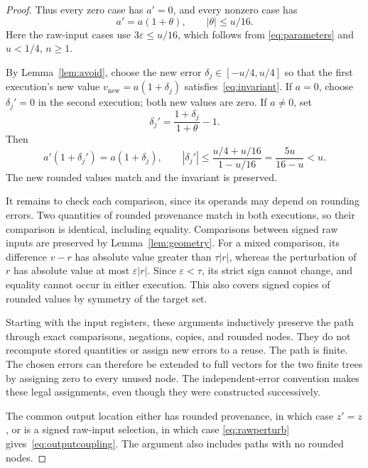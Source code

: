 \documentclass[11pt,a4paper]{article}
\numberwithin{equation}{section}
\theoremstyle{definition}
\theoremstyle{remark}
\newcommand{\abs}[1]{\left|#1\right|}
\begin{document}
\begin{proof}
Thus every zero case has $a'=0$, and every nonzero case has
\begin{equation}\label{eq:centerchange}
 a'=a(1+\theta),\qquad\abs\theta\le u/16.
\end{equation}
Here the raw-input cases use $3\varepsilon\le u/16$, which follows from
\eqref{eq:parameters} and $u<1/4$, $n\ge1$.

By Lemma~\ref{lem:avoid}, choose the new error $\delta_j\in[-u/4,u/4]$
so that the first execution's new value
$v_{\mathrm{new}}=a(1+\delta_j)$ satisfies~\eqref{eq:invariant}.
If $a=0$, choose $\delta_j'=0$ in the second execution; both new values
are zero.  If $a\ne0$, set
\begin{equation}\label{eq:matcherror}
 \delta_j'=\frac{1+\delta_j}{1+\theta}-1.
\end{equation}
Then
\[
 a'(1+\delta_j')=a(1+\delta_j),
 \qquad
 \abs{\delta_j'}
 \le\frac{u/4+u/16}{1-u/16}
 =\frac{5u}{16-u}<u.
\]
The new rounded values match and the invariant is preserved.

It remains to check each comparison, since its operands may depend on
rounding errors.  Two quantities of rounded provenance match in both
executions, so their comparison is identical, including equality.
Comparisons between signed raw inputs are preserved by
Lemma~\ref{lem:geometry}.  For a mixed comparison, its difference $v-r$
has absolute value greater than $\tau\abs r$, whereas the perturbation
of $r$ has absolute value at most $\varepsilon\abs r$.  Since
$\varepsilon<\tau$, its strict sign cannot change, and equality cannot
occur in either execution.  This also covers signed copies of rounded
values by symmetry of the target set.

Starting with the input registers, these arguments inductively preserve
the path through exact comparisons, negations, copies, and rounded nodes.
They do not recompute stored quantities or assign new errors to a reuse.
The path is finite.  The chosen errors can therefore be extended to full
vectors for the two finite trees by assigning zero to every unused node.
The independent-error convention makes these legal assignments, even
though they were constructed successively.

The common output location either has rounded provenance, in which case
$z'=z$, or is a signed raw-input selection, in which case
\eqref{eq:rawperturb} gives~\eqref{eq:outputcoupling}.
The argument also includes paths with no rounded nodes.
\end{proof}
\end{document}
